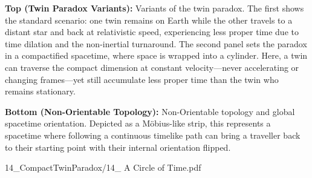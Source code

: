 \begin{SideNotePage}{
  \textbf{Top (Twin Paradox Variants):} Variants of the twin paradox. The first shows the standard scenario: one twin remains on Earth while the other travels to a distant star and back at relativistic speed, experiencing less proper time due to time dilation and the non-inertial turnaround. The second panel sets the paradox in a compactified spacetime, where space is wrapped into a cylinder. Here, a twin can traverse the compact dimension at constant velocity—never accelerating or changing frames—yet still accumulate less proper time than the twin who remains stationary. \par
  \textbf{Bottom (Non-Orientable Topology):} Non-Orientable topology and global spacetime orientation. Depicted as a Möbius-like strip, this represents a spacetime where following a continuous timelike path can bring a traveller back to their starting point with their internal orientation flipped. \par
}{14_CompactTwinParadox/14_ A Circle of Time.pdf}
\end{SideNotePage}
